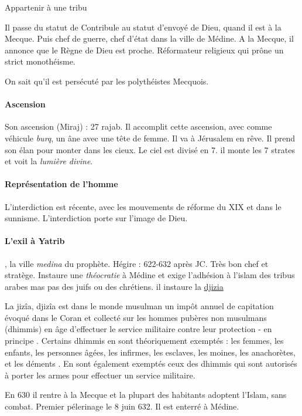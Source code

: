 \begin{Def}[Contribule]
Appartenir à une tribu
\end{Def}
Il passe du statut de Contribule au statut d'envoyé de Dieu, quand il est à la Mecque. Puis chef de guerre, chef d'état dans la ville de Médine. 
A la Mecque, il annonce que le Règne de Dieu est proche. Réformateur religieux qui prône un strict monothéisme. 

On sait qu'il est persécuté par les polythéistes Mecquois.  
\paragraph{Ascension} Son ascension (Miraj) : 27 rajab. Il accomplit cette ascension, avec comme véhicule \textit{burq}, un âne avec une tête de femme. Il va à Jérusalem en rêve. Il prend son élan pour monter dans les cieux. Le ciel est divisé en 7. il monte les 7 strates et voit la \textit{lumière divine}.


\paragraph{Représentation de l'homme} L'interdiction est récente, avec les mouvements de réforme du XIX et dans le sunnisme. L'interdiction porte sur l'image de Dieu.

\paragraph{L'exil à Yatrib}, la ville \emph{medina} du prophète. Hégire : 622-632 après JC. Très bon chef et stratège. Instaure une \textit{théocratie} à Médine et exige l'adhésion à l'islam des tribus arabes mas pas des juifs ou des chrétiens. il instaure la \href{https://fr.wikipedia.org/wiki/Djiz%C3%AEa}{djizia} 
\begin{Def}[djizia]
 La jizîa, djizîa  est dans le monde musulman un impôt annuel de capitation évoqué dans le Coran et collecté sur les hommes pubères non musulmans (dhimmis) en âge d'effectuer le service militaire  contre leur protection - en principe . Certains dhimmis en sont théoriquement exemptés : les femmes, les enfants, les personnes âgées, les infirmes, les esclaves, les moines, les anachorètes, et les déments . En sont également exemptés ceux des dhimmis qui sont autorisés à porter les armes pour effectuer un service militaire.
   
\end{Def}

En 630 il rentre à la Mecque et la plupart des habitants adoptent l'Islam, sans combat. Premier pélerinage le 8 juin 632.
Il est enterré à Médine.

